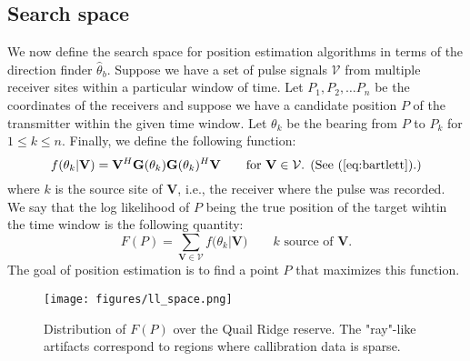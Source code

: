 \documentclass[letter]{article}
\begin{document}
  \subsection{Search space} 
We now define the search space for position estimation algorithms in terms of the direction 
finder $\hat{\theta}_b$. Suppose we have a set of pulse signals $\mathcal{V}$ from multiple receiver 
sites within a particular window of time. Let $P_1, P_2, \dots P_n$ be the coordinates of the 
receivers and suppose we have a candidate position $P$ of the transmitter within the given 
time window. Let $\theta_k$ be the bearing from $P$ to $P_k$ for $1 \le k \le n$. Finally, 
we define the following function: 
\begin{equation*}
  f(\theta_k | \mathbf{V}) = 
    \mathbf{V}^H\mathbf{G}(\theta_k)\mathbf{G}(\theta_k)^H\mathbf{V} 
  \qquad \text{for $\mathbf{V} \in \mathcal{V}$. (See (\ref{eq:bartlett}).)}
\end{equation*}
where $k$ is the source site of $\mathbf{V}$, i.e., the receiver where the pulse was recorded.
We say that the log likelihood of $P$ being the true position of the target wihtin the time 
window is the following quantity: 
\begin{equation}
  F(P) = \sum_{\mathbf{V} \in \mathcal{V}}{f(\theta_k | \mathbf{V}}) 
  \qquad \text{$k$ source of $\mathbf{V}$.}
\end{equation}
The goal of position estimation is to find a point $P$ that maximizes this 
function. 

\pagebreak
\begin{figure}
  \vspace{-60pt}
  \begin{center}
    \texttt{[image: figures/ll\_space.png]}
  \end{center}
  \caption{Distribution of $F(P)$ over the Quail Ridge reserve. 
   The "ray"-like artifacts correspond to regions where callibration data 
   is sparse.}
  \vspace{-10pt}
\end{figure}
\end{document}
